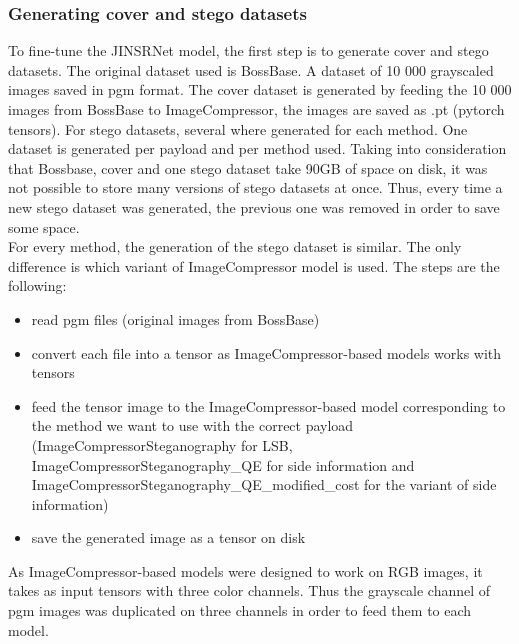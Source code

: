 \documentclass[12pt]{article}
\begin{document}
\subsubsection{Generating cover and stego datasets}
To fine-tune the JINSRNet model, the first step is to generate cover and stego datasets. The original dataset used is BossBase. A dataset of 10 000 grayscaled images saved in pgm format. 
The cover dataset is generated by feeding the 10 000 images from BossBase to ImageCompressor, the images are saved as .pt (pytorch tensors). For stego datasets, several where generated for each method. One dataset is generated per payload and per method used. Taking into consideration that Bossbase, cover and one stego dataset take 90GB of space on disk, it was not possible to store many versions of stego datasets at once. Thus, every time a new stego dataset was generated, the previous one was removed in order to save some space.\\
For every method, the generation of the stego dataset is similar. The only difference is which variant of ImageCompressor model is used. The steps are the following:
\begin{itemize}
    \item read pgm files (original images from BossBase)
    \item convert each file into a tensor as ImageCompressor-based models works with tensors
    \item feed the tensor image to the ImageCompressor-based model corresponding to the method we want to use with the correct payload (ImageCompressorSteganography for LSB, ImageCompressorSteganography\_QE for side information and ImageCompressorSteganography\_QE\_modified\_cost for the variant of side information)
    \item save the generated image as a tensor on disk
\end{itemize}

As ImageCompressor-based models were designed to work on RGB images, it takes as input tensors with three color channels. Thus the grayscale channel of pgm images was duplicated on three channels in order to feed them to each model.
\end{document}
